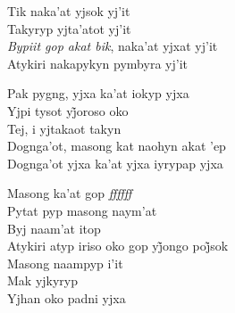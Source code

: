\bigskip

\begin{linenumbers}\begingroup\raggedright
 
\noindent   Tik naka'at yjsok yj'it\\
  Takyryp yjta'atot yj'it\\
  \emph{Bypiit gop akat bik}, naka'at yjxat yj'it\\
  Atykiri nakapykyn pymbyra yj'it
 
\end{linenumbers}\endgroup

\bigskip

\begin{linenumbers}\begingroup\raggedright
 
\noindent   Pak pygng, yjxa ka'at iokyp yjxa\\
  Yjpi tysot yj̃oroso oko\\
  Tej, i yjtakaot takyn\\
  Dognga'ot, masong kat naohyn akat 'ep\\
  Dognga'ot yjxa ka'at yjxa iyrypap yjxa
 
\end{linenumbers}\endgroup

\bigskip

\begin{linenumbers}\begingroup\raggedright
 
\noindent   Masong ka'at gop \emph{ffffff}\\
  Pytat pyp masong naym'at\\
  Byj naam'at itop\\
  Atykiri atyp iriso oko gop yj̃ongo poj̃sok\\
  Masong naampyp i'it\\
  Mak yjkyryp\\
  Yjhan oko padni yjxa
 
\end{linenumbers}\endgroup

